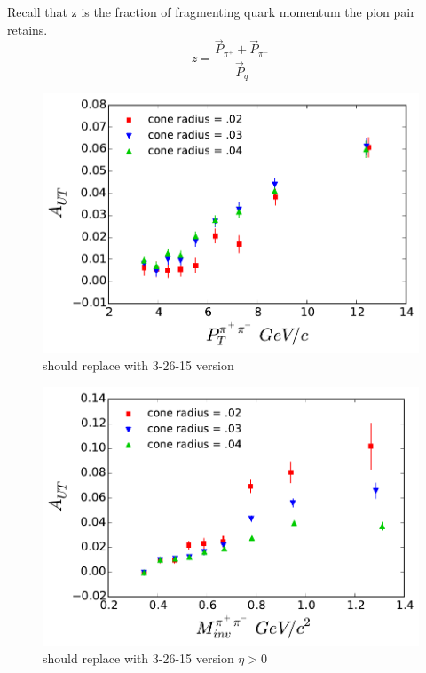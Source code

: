 \documentclass[abstract = on,listof=totoc, bibliography=totoc]{scrreprt}
\newcommand{\ptpair}{P_{T}^{\pi^+\pi^-}}
\newcommand{\mpair}{M_{inv}^{\pi^+\pi^-}}
\newcommand{\pip}{\pi^+}
\newcommand{\pim}{\pi^-}
\begin{document}
Recall that z is the fraction of fragmenting quark momentum the pion pair retains.
\begin{equation}
\label{eq:mptrelate}
z = \frac{\vec{P}_{\pip} + \vec{P}_{\pim}}{\vec{P}_q}
\end{equation}
%

\begin{figure}
\begin{center}
\includegraphics[width = .8\textwidth]{allConeAsymsVs_Pt_8_24_15_HiEta}
\caption[Asymmetry vs $\ptpair$ for different cone radii]{should replace with 3-26-15 version}
\label{fig:allConesPt $\eta > 0$}
\end{center}
\end{figure}

\begin{figure}
\begin{center}
\includegraphics[width = .8\textwidth]{allConeAsymsVs_Mass_8_24_15_HiEta}
\caption[Asymmetry vs $\mpair$ for different cone radii]{should replace with 3-26-15 version $\eta > 0$}
\label{fig:allConesMass}
\end{center}
\end{figure}
\end{document}
